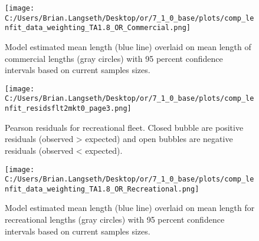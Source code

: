 \documentclass[11pt,
  english,
  a4paper,
]{article}
\begin{document}
\tagmcend\tagstructend


\begin{figure}
\centering
\texttt{[image: C:/Users/Brian.Langseth/Desktop/or/7\_1\_0\_base/plots/comp\_lenfit\_data\_weighting\_TA1.8\_OR\_Commercial.png]}
\caption{Model estimated mean length (blue line) overlaid on mean length of commercial lengths (gray circles) with 95 percent confidence intervals based on current samples sizes.\label{fig:com-mean-len-fit}}
\end{figure}

\tagmcend\tagstructend


\begin{figure}
\centering
\texttt{[image: C:/Users/Brian.Langseth/Desktop/or/7\_1\_0\_base/plots/comp\_lenfit\_residsflt2mkt0\_page3.png]}
\caption{Pearson residuals for recreational fleet. Closed bubble are positive residuals (observed \textgreater{} expected) and open bubbles are negative residuals (observed \textless{} expected).\label{fig:rec-pearson}}
\end{figure}

\tagmcend\tagstructend


\begin{figure}
\centering
\texttt{[image: C:/Users/Brian.Langseth/Desktop/or/7\_1\_0\_base/plots/comp\_lenfit\_data\_weighting\_TA1.8\_OR\_Recreational.png]}
\caption{Model estimated mean length (blue line) overlaid on mean length for recreational lengths (gray circles) with 95 percent confidence intervals based on current samples sizes.\label{fig:rec-mean-len-fit}}
\end{figure}

\tagmcend\tagstructend
\end{document}
